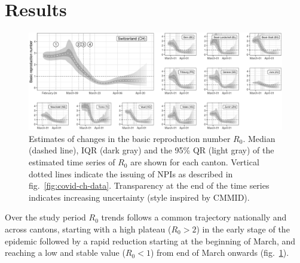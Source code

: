 \section{Results}
\begin{figure}\centering
  \includegraphics[width=\textwidth]{fig_covid-switzerland-npi/FIGURE_2.png}
  \caption[Estimates of changes in the basic reproduction number $R_0$]{Estimates of changes in the basic reproduction number $R_0$. Median (dashed line), IQR (dark gray) and the 95\% QR (light gray) of the estimated time series of $R_0$ are shown for each canton. Vertical dotted lines indicate the issuing of NPIs as described in fig.~\ref{fig:covid-ch-data}. Transparency at the end of the time series indicates increasing uncertainty (style inspired by CMMID).}
  \label{fig:covid-ch-r0}
\end{figure}
Over the study period $R_0$ trends follows a common trajectory nationally and across cantons, starting with a high plateau ($R_0 >2$) in the early stage of the epidemic followed by a rapid reduction starting at the beginning of March, and reaching a low and stable value ($R_0 <1$) from end of March onwards (fig.~\ref{fig:covid-ch-r0}). 

